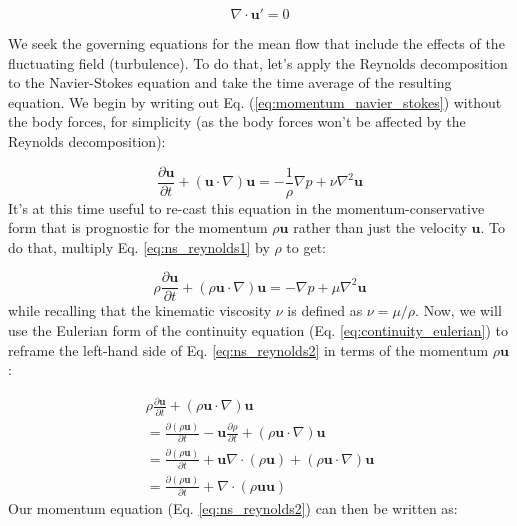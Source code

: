 \documentclass[12pt]{article}
\numberwithin{equation}{section}
\numberwithin{figure}{section}
\numberwithin{table}{section}
\begin{document}
\begin{equation}
  \nabla \cdot \mathbf{u}' = 0
\end{equation}

We seek the governing equations for the mean flow that include the effects of
the fluctuating field (turbulence).
To do that, let's apply the Reynolds decomposition to the Navier-Stokes equation
and take the time average of the resulting equation.
We begin by writing out Eq. (\ref{eq:momentum_navier_stokes}) without the
body forces, for simplicity (as the body forces won't be affected by the
Reynolds decomposition):

\begin{equation}
  \frac{\partial \mathbf{u}}{\partial t} + (\mathbf{u} \cdot \nabla) \mathbf{u} =
  - \frac{1}{\rho} \nabla p + \nu \nabla^2 \mathbf{u}
  \label{eq:ns_reynolds1}
\end{equation}
It's at this time useful to re-cast this equation in the momentum-conservative
form that is prognostic for the momentum $\rho \mathbf{u}$ rather than just the
velocity $\mathbf{u}$.
To do that, multiply Eq. \ref{eq:ns_reynolds1} by $\rho$ to get:

\begin{equation}
  \rho \frac{\partial \mathbf{u}}{\partial t} + (\rho \mathbf{u} \cdot \nabla) \mathbf{u} =
  - \nabla p + \mu \nabla^2 \mathbf{u}
  \label{eq:ns_reynolds2}
\end{equation}
while recalling that the kinematic viscosity $\nu$ is defined as
$\nu = \mu / \rho$.
Now, we will use the Eulerian form of the continuity equation
(Eq. \ref{eq:continuity_eulerian}) to reframe the left-hand side of Eq.
\ref{eq:ns_reynolds2} in terms of the momentum $\rho \mathbf{u}$:

\begin{equation}
\begin{split}
  \rho \frac{\partial \mathbf{u}}{\partial t} + (\rho \mathbf{u} \cdot \nabla) \mathbf{u} \\
  = \frac{\partial (\rho \mathbf{u})}{\partial t} - \mathbf{u} \frac{\partial \rho}{\partial t} + (\rho \mathbf{u} \cdot \nabla) \mathbf{u} \\
  = \frac{\partial (\rho \mathbf{u})}{\partial t} + \mathbf{u} \nabla \cdot (\rho \mathbf{u}) + (\rho \mathbf{u} \cdot \nabla) \mathbf{u} \\
  = \frac{\partial (\rho \mathbf{u})}{\partial t} + \nabla \cdot (\rho \mathbf{u} \mathbf{u})
\end{split}
\end{equation}
Our momentum equation (Eq. \ref{eq:ns_reynolds2}) can then be written as:
\end{document}
